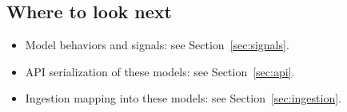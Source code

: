 \subsection{Where to look next}
\label{subsec:models:next}

\begin{itemize}
  \item Model behaviors and signals: see Section~\ref{sec:signals}.
  \item API serialization of these models: see Section~\ref{sec:api}.
  \item Ingestion mapping into these models: see Section~\ref{sec:ingestion}.
\end{itemize}

